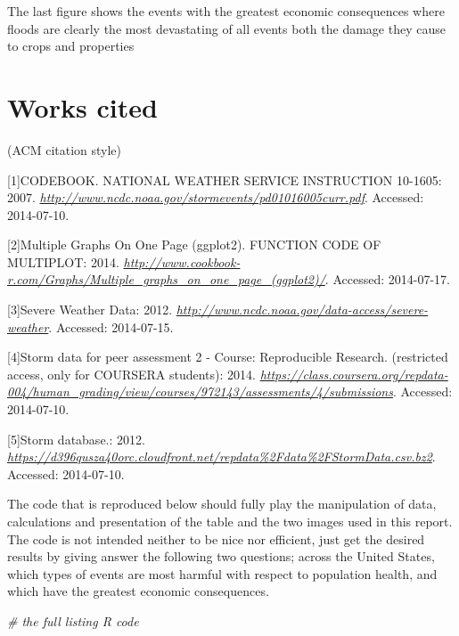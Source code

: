 \documentclass[12pt,spanish, american,b4paper, onecolumn, lmargin=1cm, rmargin=1cm, tmargin=1cm, bmargin=2cm,]{article}
\newenvironment{Shaded}{}{}
\newcommand{\CommentTok}[1]{\textcolor[rgb]{0.50,0.50,0.50}{\textit{{#1}}}}
\begin{document}
The last figure shows the events with the greatest economic consequences
where floods are clearly the most devastating of all events both the
damage they cause to crops and properties

\newpage

\section{Works cited \label{references}}\label{works-cited}

\tiny{ (ACM citation style)} \normalsize
\setlength{\parindent}{-0.40cm} \indent

{[}1{]}CODEBOOK. NATIONAL WEATHER SERVICE INSTRUCTION 10-1605: 2007.
\emph{\url{http://www.ncdc.noaa.gov/stormevents/pd01016005curr.pdf}}.
Accessed: 2014-07-10.

{[}2{]}Multiple Graphs On One Page (ggplot2). FUNCTION CODE OF
MULTIPLOT: 2014.
\emph{\url{http://www.cookbook-r.com/Graphs/Multiple_graphs_on_one_page_(ggplot2)/}}.
Accessed: 2014-07-17.

{[}3{]}Severe Weather Data: 2012.
\emph{\url{http://www.ncdc.noaa.gov/data-access/severe-weather}}.
Accessed: 2014-07-15.

{[}4{]}Storm data for peer assessment 2 - Course: Reproducible Research.
(restricted access, only for COURSERA students): 2014.
\emph{\url{https://class.coursera.org/repdata-004/human_grading/view/courses/972143/assessments/4/submissions}}.
Accessed: 2014-07-10.

{[}5{]}Storm database.: 2012.
\emph{\url{https://d396qusza40orc.cloudfront.net/repdata\%2Fdata\%2FStormData.csv.bz2}}.
Accessed: 2014-07-10.

\newpage


The code that is reproduced below should fully play the manipulation of
data, calculations and presentation of the table and the two images used
in this report. The code is not intended neither to be nice nor
efficient, just get the desired results by giving answer the following
two questions; across the United States, which types of events are most
harmful with respect to population health, and which have the greatest
economic consequences.

\begin{Shaded}
\begin{Highlighting}[]
\CommentTok{# the full listing R code }
\end{Highlighting}
\end{Shaded}
\end{document}
